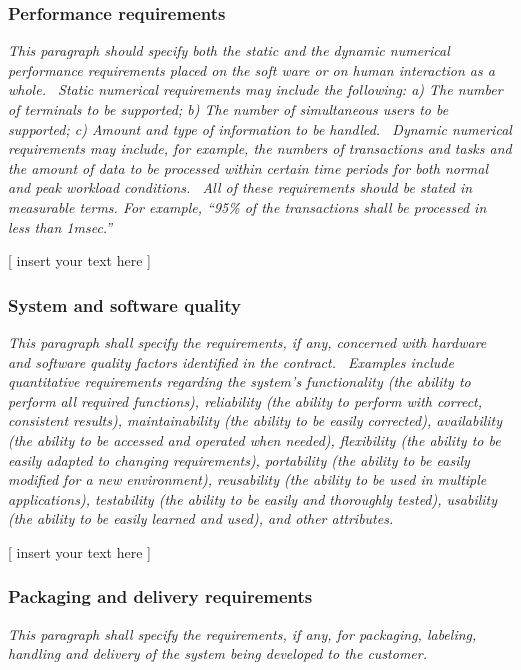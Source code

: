 \documentclass[twoside,letterpaper]{article}
\begin{document}
\subsubsection[Performance
requirements]{\rmfamily\bfseries\color{black}
Performance requirements}
{\itshape\color{black}
This paragraph should specify both the static and the dynamic numerical
performance requirements placed on the soft ware or on human
interaction as a whole. \ Static numerical requirements may include the
following: a) The number of terminals to be supported; b) The number of
simultaneous users to be supported; c) Amount and type of information
to be handled. \ Dynamic numerical requirements may include, for
example, the numbers of transactions and tasks and the amount of data
to be processed within certain time periods for both normal and peak
workload conditions. \ All of these requirements should be stated in
measurable terms. For example, {\textquotedblleft}95\% of the
transactions shall be processed in less than
1msec.{\textquotedblright}}

{\color{black}
[ insert your text here ]}

\subsubsection[System and software
quality]{\rmfamily\bfseries\color{black} System
and software quality}
{\itshape\color{black}
This paragraph shall specify the requirements, if any, concerned with
hardware and software quality factors identified in the contract.
\ Examples include quantitative requirements regarding the
system{\textquoteright}s functionality (the ability to perform all
required functions), reliability (the ability to perform with correct,
consistent results), maintainability (the ability to be easily
corrected), availability (the ability to be accessed and operated when
needed), flexibility (the ability to be easily adapted to changing
requirements), portability (the ability to be easily modified for a new
environment), reusability (the ability to be used in multiple
applications), testability (the ability to be easily and thoroughly
tested), usability (the ability to be easily learned and used), and
other attributes.}

{\color{black}
[ insert your text here ]}

\subsubsection[Packaging and delivery
requirements]{\rmfamily\bfseries\color{black}
Packaging and delivery requirements}
{\itshape\color{black}
This paragraph shall specify the requirements, if any, for packaging,
labeling, handling and delivery of the system being developed to the
customer.}
\end{document}
